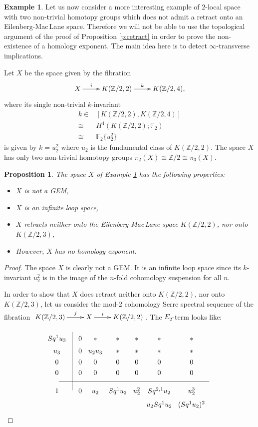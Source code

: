 \documentclass{conm-p-l}
\newtheorem{prop}[thm]{Proposition}
\theoremstyle{definition}
\newtheorem{exmp}[thm]{Example}
\newcommand{\Z}{\mathbb{Z}}
\newcommand{\F}{\mathbb{F}}
\begin{document}
\begin{exmp}\label{e:no_retract}
Let us now consider a more interesting example of $2$-local space with two non-trivial homotopy groups which does not admit a retract onto an Eilenberg-Mac\,Lane space. Therefore we will not be able to use the topological argument of the proof of Proposition \ref{p:retract} in order to prove the non-existence of a homology exponent. The main idea here is to detect $\infty$-transverse implications.

Let $X$ be the space given by the fibration
$$\xymatrix{
X\ar[r]^-i &K(\Z/2,2)\ar[r]^-k &K(\Z/2,4),
}$$
where its single non-trivial $k$-invariant
\begin{align*}
k \in& [K(\Z/2,2),K(\Z/2,4)]\\
\cong &H^4(K(\Z/2,2);\F_2)\\
\cong &\F_2\{u_2^2\}
\end{align*}
is given by $k=u_2^2$ where $u_2$ is the fundamental class of $K(\Z/2,2)$. The space $X$ has only two non-trivial homotopy groups $\pi_2(X)\cong\Z/2\cong\pi_3(X)$.

\begin{prop}\label{p:no_retract}
The space $X$ of Example \ref{e:no_retract} has the following properties:
\begin{itemize}
\item[1.]{$X$ is not a GEM,}
\item[2.]{$X$ is an infinite loop space,}
\item[3.]{$X$ retracts neither onto the Eilenberg-Mac\,Lane space $K(\Z/2,2)$, nor onto $K(\Z/2,3)$,}
\item[4.]{However, $X$ has no homology exponent.}
\end{itemize}
\end{prop}

\begin{proof}
The space $X$ is clearly not a GEM. It is an infinite loop space since its $k$-invariant $u_2^2$ is in the image of the $n$-fold cohomology suspension for all $n$. 

In order to show that $X$ does retract neither onto $K(\Z/2,2)$, nor onto $K(\Z/2,3)$, let us consider the mod-$2$ cohomology Serre spectral sequence of the fibration $\xymatrix{K(\Z/2,3)\ar[r]^-j &X\ar[r]^-i &K(\Z/2,2)}$. 
The $E_2$-term looks like:
$$\xymatrix@R=0.1cm@C=0.1cm{
&&\\
{Sq^1u_3}  &&0 &{*} &{*} &{*} &{*} &{*}\\
{u_3}  &&0 &u_2u_3&{*} &{*} &{*} &{*}\\
{0} &&0 &0 &0 &0 &0 &0\\
{0} &&0 &0 &0 &0 &0 &0\\ \ar@{-}[rrrrrrrr] &&&&&&&&\\
{1} &\ar@{-}[uuuuuu] &{0} &{u_2} &{Sq^1u_2} &{u_2^2} &{Sq^{2,1}u_2} &{u_2^3}\\
&&&&&&{u_2Sq^1u_2} &{(Sq^1 u_2)^2}
}$$


\end{proof}
\end{exmp}
\end{document}
